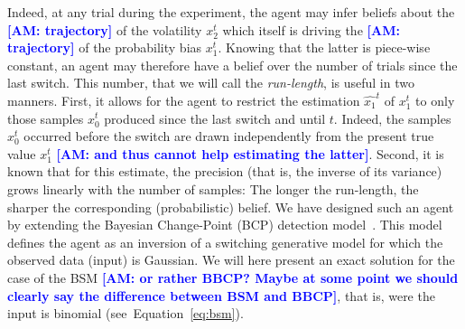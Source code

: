 \documentclass[12pt,english]{article}%
\newcommand{\citep}[1]{\parencite{#1}}
\newcommand{\seeEq}[1]{Equation~\ref{eq:#1}}
\newcommand{\AM}[1]{\textbf{\textcolor{blue}{[AM: #1]}}}
\begin{document}
Indeed, at any trial during the experiment,
the agent may infer beliefs about the \AM{trajectory} of the volatility $x_2^t$
which itself is driving the \AM{trajectory} of the probability bias $x_1^t$.
Knowing that the latter is piece-wise constant,
an agent may therefore have a belief over the number of trials since the last switch.
This number, that we will call the \emph{run-length}, is useful in two manners.
First, it allows for the agent to restrict the estimation $\hat{x_1}^{t}$ of $x_1^t$
to only those samples $x_0^t$ produced since the last switch and until $t$.
Indeed, the samples $x_0^t$ occurred before the switch are drawn independently from the present true value $x_1^t$ \AM{and thus cannot help estimating the latter}.
Second, it is known that for  this estimate, the precision
(that is, the inverse of its variance)
grows linearly with the number of samples:
The longer the run-length, the sharper the corresponding (probabilistic) belief.
We have designed such an agent by extending
the Bayesian Change-Point (BCP) detection model~\citep{AdamsMackay2007}.
This model defines the agent as an inversion of a switching generative model
for which the observed data (input) is Gaussian.
We will here present an exact solution for the case of the BSM \AM{or rather BBCP? Maybe at some point we should clearly say the difference between BSM and BBCP},
that is, were the input is binomial (see~\seeEq{bsm}).
\end{document}
